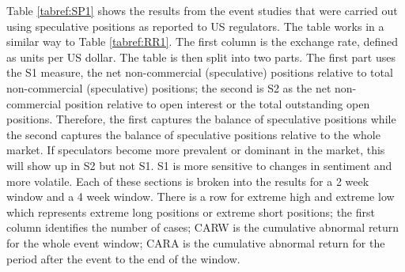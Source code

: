 \documentclass[preprint,12pt,authoryear]{elsarticle}
\begin{document}
Table \ref{tabref:SP1} shows the results from the event studies that were carried out using speculative positions as reported to US regulators.  The table works in a similar way to Table \ref{tabref:RR1}.  The first column is the exchange rate, defined as units per US dollar.  The table is then split into two parts.  The first part uses the S1 measure, the net non-commercial (speculative) positions relative to total non-commercial (speculative) positions; the second is S2 as the net non-commercial position relative to open interest or the total outstanding open positions.  Therefore, the first captures the balance of speculative positions while the second captures the balance of speculative positions relative to the whole market.  If speculators become more prevalent or dominant in the market, this will show up in S2 but not S1.  S1 is more sensitive to changes in sentiment and more volatile. Each of these sections is broken into the results for a 2 week window and a 4 week window.  There is a row for extreme high and extreme low which represents extreme long positions or extreme short positions; the first  column identifies the number of cases; CARW is the cumulative abnormal return for the whole event window; CARA is the cumulative abnormal return for the period after the event to the end of the window.     
\end{document}
